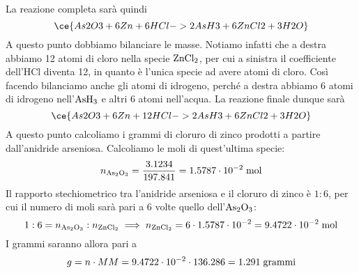 \begin{soluzione}
    La reazione completa sarà quindi
    \begin{equation*}
        \ce{As2O3 + 6Zn + 6HCl -> 2AsH3 + 6ZnCl2 + 3H2O}
    \end{equation*}
    A questo punto dobbiamo bilanciare le masse. Notiamo infatti che a destra abbiamo 12 atomi di cloro nella specie $\rm ZnCl_2$, per cui a sinistra il coefficiente dell'HCl diventa 12, in quanto è l'unica specie ad avere atomi di cloro. Così facendo bilanciamo anche gli atomi di idrogeno, perché a destra abbiamo 6 atomi di idrogeno nell'$\rm AsH_3$ e altri 6 atomi nell'acqua. La reazione finale dunque sarà
    \begin{equation*}
        \ce{As2O3 + 6Zn + 12HCl -> 2AsH3 + 6ZnCl2 + 3H2O}
    \end{equation*}
    A questo punto calcoliamo i grammi di cloruro di zinco prodotti a partire dall'anidride arseniosa. Calcoliamo le moli di quest'ultima specie:
    \begin{equation*}
        n_{\rm As_2O_3}
        =\frac{3.1234}{197.841}
        =1.5787 \cdot 10^{-2} \; \rm mol
    \end{equation*}
    Il rapporto stechiometrico tra l'anidride arseniosa e il cloruro di zinco è $1:6$, per cui il numero di moli sarà pari a 6 volte quello dell'$\rm As_2O_3$:
    \begin{equation*}
        1:6=n_{\rm As_2O_3}:n_{\rm ZnCl_2}
        \implies
        n_{\rm ZnCl_2}
        =6 \cdot 1.5787 \cdot 10^{-2}
        =9.4722 \cdot 10^{-2} \; \rm mol
    \end{equation*}
    I grammi saranno allora pari a
    \begin{equation*}
        g
        =n \cdot MM
        =9.4722 \cdot 10^{-2} \cdot 136.286
        =1.291 \; \rm grammi
    \end{equation*}
\end{soluzione}

\newpage

